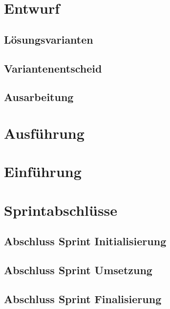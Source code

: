 \chapter{Entwurf}

\section{Lösungsvarianten}

\section{Variantenentscheid}

\section{Ausarbeitung}

\chapter{Ausführung}



\chapter{Einführung}

\chapter{Sprintabschlüsse}

\section{Abschluss Sprint Initialisierung}

\section{Abschluss Sprint Umsetzung}

\section{Abschluss Sprint Finalisierung}


